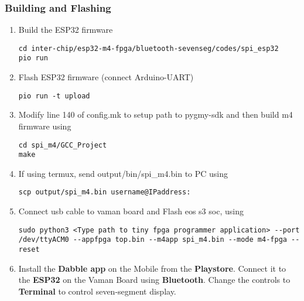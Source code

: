 \subsubsection{Building and Flashing}
\begin{enumerate}[resume]
\item Build the ESP32 firmware
\begin{lstlisting}
cd inter-chip/esp32-m4-fpga/bluetooth-sevenseg/codes/spi_esp32
pio run
\end{lstlisting} 

\item Flash ESP32 firmware (connect Arduino-UART)
\begin{lstlisting}
pio run -t upload
\end{lstlisting} 

\item  Modify line 140 of config.mk to setup path to pygmy-sdk and then build m4
firmware using
\begin{lstlisting}
cd spi_m4/GCC_Project
make
\end{lstlisting}

\item If using termux, send output/bin/spi{\_}m4.bin to PC using
\begin{lstlisting}
scp output/spi_m4.bin username@IPaddress:
\end{lstlisting}

\item Connect usb cable to vaman board and Flash eos s3 soc, using
\begin{lstlisting}
sudo python3 <Type path to tiny fpga programmer application> --port /dev/ttyACM0 --appfpga top.bin --m4app spi_m4.bin --mode m4-fpga --reset
\end{lstlisting} 

\item Install the \textbf{Dabble app} on the Mobile from the \textbf{Playstore}.
Connect it to the \textbf{ESP32} on the Vaman Board using \textbf{Bluetooth}. 
Change the controls to \textbf{Terminal} to control seven-segment display.
\end{enumerate}